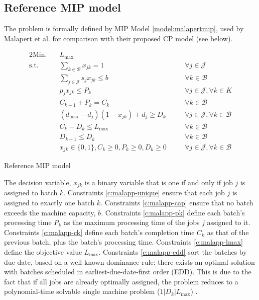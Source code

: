 \documentclass[oribibl]{llncs}
\def\Lmax{{L_{\mathrm{max}}}}
\begin{document}
\subsection{Reference MIP model} The problem is formally defined by MIP
Model \ref{model:malapertmip}, used by Malapert et al. \cite{Malapert} for comparison
with their proposed CP model (see below).

\begin{model}[h]
\begin{alignat}{2}
\mathrm{Min.}\quad & \Lmax && \\
\mathrm{s.t.}\quad &\sum_{k \in \mathcal{B}} x_{jk} = 1 \quad && \forall j \in \mathcal{J}
\label{c:malapp-unique}\\
  &\sum_{j \in \mathcal{J}} s_j x_{jk} \leq b \quad && \forall k \in \mathcal{B}\label{c:malapp-cap}\\
  &p_j x_{jk} \leq P_k \quad && \forall j \in \mathcal{J}, \forall k \in
  K\label{c:malapp-pk}\\
  &C_{k-1} + P_{k} = C_k \quad && \forall k \in \mathcal{B}\label{c:malapp-ck}\\
  &(d_\mathrm{max} - d_j)(1 - x_{jk}) + d_j \geq D_k \quad && \forall j \in \mathcal{J}, \forall
  k \in \mathcal{B}\label{c:malapp-dk}\\
&C_k - D_k \leq \Lmax \quad && \forall k \in \mathcal{B}\label{c:malapp-lmax}\\
  &D_{k-1} \leq D_k \quad && \forall k \in \mathcal{B} \label{c:malapp-edd} \\%
  &x_{jk} \in \{0,1\}, C_k \geq 0, P_k \geq 0, D_k \geq 0 \quad && \forall j \in \mathcal{J}, \forall k \in \mathcal{B}  
\end{alignat}
\caption{Reference MIP model}
\label{model:malapertmip}
\end{model}

The decision variable, $x_{jk}$ is a binary variable that is one
if and only if job $j$ is assigned to batch $k$. Constraints
\eqref{c:malapp-unique} ensure that each job $j$ is assigned to exactly
one batch $k$. Constraints \eqref{c:malapp-cap} ensure that no batch
exceeds the machine capacity, $b$. Constraints \eqref{c:malapp-pk}
define each batch's processing time $P_k$ as the maximum processing time
of the jobs $j$ assigned to it. Constraints \eqref{c:malapp-ck} define
each batch's completion time $C_k$ as that of the previous batch, plus
the batch's processing time. Constraints \eqref{c:malapp-lmax} define
the objective value $\Lmax$. Constraints \eqref{c:malapp-edd} sort the
batches by due date, based on a well-known dominance rule: there exists
an optimal solution with batches scheduled in earliest-due-date-first
order (EDD). This is due to the fact that if all jobs are already optimally
assigned, the problem reduces to a polynomial-time solvable single machine
problem ($1|D_k|\Lmax$) \cite{Pinedo03}.
\end{document}
